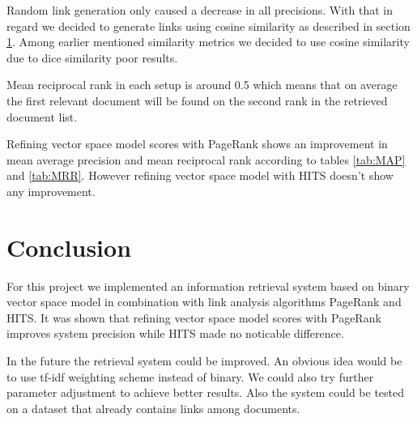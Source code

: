 \documentclass[10pt, a4paper]{article}
\begin{document}
Random link generation only caused a decrease in all precisions. With that in regard we decided to generate links using cosine similarity as described in section \ref{}. Among earlier mentioned similarity metrics we decided to use cosine similarity due to dice similarity poor results.

Mean reciprocal rank in each setup is around 0.5 which means that on average the first relevant document will be found on the second rank in the retrieved document list.

Refining vector space model scores with PageRank shows an improvement in mean average precision and mean reciprocal rank according to tables \ref{tab:MAP} and \ref{tab:MRR}. However refining vector space model with HITS doesn't show any improvement.

\section{Conclusion}
For this project we implemented an information retrieval system based on binary vector space model in combination with link analysis algorithms PageRank and HITS. It was shown that refining vector space model scores with PageRank improves system precision while HITS made no noticable difference.

In the future the retrieval system could be improved. An obvious idea would be to use tf-idf weighting scheme instead of binary. We could also try further parameter adjustment to achieve better results. Also the system could be tested on a dataset that already contains links among documents.




\end{document}
